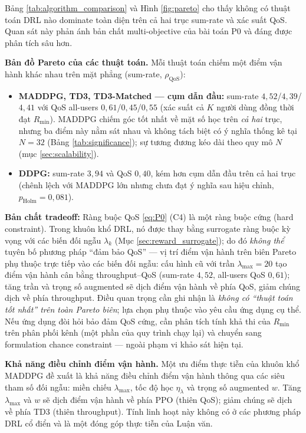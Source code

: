Bảng \ref{tab:algorithm_comparison} và Hình \ref{fig:pareto} cho thấy
không có thuật toán DRL nào dominate toàn diện trên cả hai trục
sum-rate và xác suất QoS. Quan sát này phản ánh bản chất multi-objective
của bài toán P0 và đáng được phân tích sâu hơn.

\textbf{Bản đồ Pareto của các thuật toán.} Mỗi thuật toán chiếm một
điểm vận hành khác nhau trên mặt phẳng (sum-rate, $\rho_{\text{QoS}}$):
\begin{itemize}[leftmargin=*]
\item \textbf{MADDPG, TD3, TD3-Matched --- cụm dẫn đầu:} sum-rate
$4{,}52$/$4{,}39$/$4{,}41$ với QoS all-users $0{,}61$/$0{,}45$/$0{,}55$
(xác suất cả $K$ người dùng đồng thời đạt $R_{\min}$). MADDPG chiếm góc
tốt nhất về mặt số học trên \emph{cả hai} trục, nhưng ba điểm này nằm
sát nhau và không tách biệt có ý nghĩa thống kê tại $N=32$ (Bảng
\ref{tab:significance}); sự tương đương kéo dài theo quy mô $N$ (mục
\ref{sec:scalability}).
\item \textbf{DDPG:} sum-rate $3{,}94$ và QoS $0{,}40$, kém hơn cụm
dẫn đầu trên cả hai trục (chênh lệch với MADDPG lớn nhưng chưa đạt ý
nghĩa sau hiệu chỉnh, $p_{\text{Holm}}=0{,}081$).
\end{itemize}

\textbf{Bản chất tradeoff:} Ràng buộc QoS \eqref{eq:P0} (C4) là một
ràng buộc cứng (hard constraint). Trong khuôn khổ DRL, nó được thay
bằng surrogate ràng buộc kỳ vọng với các biến đối ngẫu $\lambda_k$
(Mục \ref{sec:reward_surrogate}); do đó \emph{không thể} tuyên bố
phương pháp ``đảm bảo QoS'' --- vị trí điểm vận hành trên biên Pareto
phụ thuộc trực tiếp vào các biến đối ngẫu: cấu hình cũ với trần
$\lambda_{\max}=20$ tạo điểm vận hành cân bằng throughput--QoS
(sum-rate $4{,}52$, all-users QoS $0{,}61$); tăng trần và trọng số
augmented sẽ dịch điểm vận hành về phía QoS, giảm chúng dịch về phía
throughput. Điều quan trọng cần ghi nhận là \emph{không có
``thuật toán tốt nhất'' trên toàn Pareto biên}; lựa chọn phụ thuộc
vào yêu cầu ứng dụng cụ thể. Nếu ứng dụng đòi hỏi bảo đảm QoS cứng,
cần phân tích tính khả thi của $R_{\min}$ trên phân phối kênh (một
phần của quy trình chạy lại) và chuyển sang formulation chance
constraint --- ngoài phạm vi khảo sát hiện tại.

\textbf{Khả năng điều chỉnh điểm vận hành.} Một ưu điểm thực tiễn của
khuôn khổ MADDPG đề xuất là khả năng điều chỉnh điểm vận hành thông
qua các siêu tham số đối ngẫu: miền chiếu $\lambda_{\max}$, tốc độ học
$\eta_{\lambda}$ và trọng số augmented $w$. Tăng $\lambda_{\max}$ và
$w$ sẽ dịch điểm vận hành về phía PPO (thiên QoS); giảm chúng sẽ dịch
về phía TD3 (thiên throughput). Tính linh hoạt này không có ở các
phương pháp DRL cổ điển và là một đóng góp thực tiễn của Luận văn.

